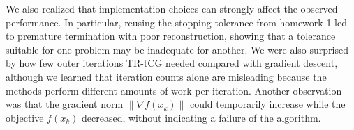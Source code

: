 \documentclass{article}
\theoremstyle{definition}
\theoremstyle{remark}
\begin{document}
We also realized that implementation choices can strongly affect
the observed performance. In particular, reusing the stopping tolerance from homework 1 led to premature termination with poor reconstruction, showing that a tolerance suitable for one problem may be inadequate for another.
We were also surprised by how few outer iterations TR-tCG needed compared with gradient descent, although we learned that iteration counts alone are misleading because the methods perform different amounts of work per iteration. Another observation was that the gradient norm \(\|\nabla f(x_k)\|\) could temporarily increase while the objective \(f(x_k)\) decreased, without indicating a failure of the algorithm.
\end{document}
